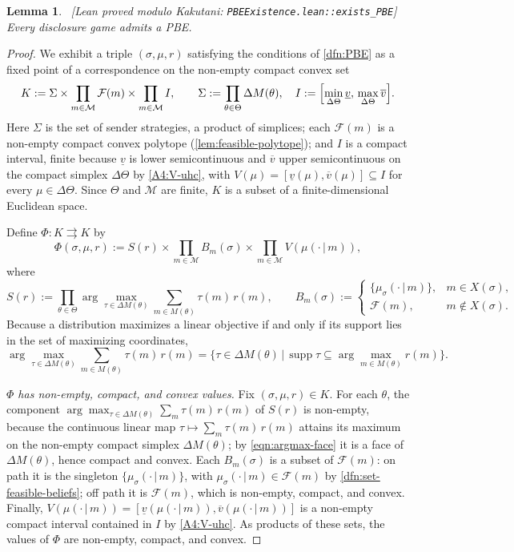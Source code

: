 \documentclass[11pt]{article}
\newtheorem{lemma}{Lemma}
\newcommand{\sep}{\,|\,}
\newcommand{\supp}{\operatorname{supp}}
\newcommand{\Msg}{\mathcal{M}}
\newcommand{\leanaxiom}[1]{{\footnotesize\textsf{\textcolor{blue!65!black}{[Lean proved modulo Kakutani: \texttt{#1}]}}}}
\begin{document}
\begin{lemma}\label{lem:pbe-existence}\ \leanaxiom{PBEExistence.lean::exists\_PBE}
    Every disclosure game admits a PBE.
\end{lemma}
\begin{proof}
We exhibit a triple $(\sigma,\mu,r)$ satisfying the conditions of \cref{dfn:PBE} as a fixed point of a correspondence on the non-empty compact convex set
\[
    K := \Sigma \times \prod_{m\in\Msg}\mathcal{F}(m) \times \prod_{m\in\Msg} I,
    \qquad
    \Sigma := \prod_{\theta\in\Theta}\Delta M(\theta),
    \quad
    I := \Bigl[\min_{\Delta\Theta}\underline{v},\,\max_{\Delta\Theta}\overline{v}\Bigr].
\]
Here $\Sigma$ is the set of sender strategies, a product of simplices; each $\mathcal{F}(m)$ is a non-empty compact convex polytope (\cref{lem:feasible-polytope}); and $I$ is a compact interval, finite because $\underline{v}$ is lower semicontinuous and $\overline{v}$ upper semicontinuous on the compact simplex $\Delta\Theta$ by \cref{A4:V-uhc}, with $V(\mu)=[\underline{v}(\mu),\overline{v}(\mu)]\subseteq I$ for every $\mu\in\Delta\Theta$. Since $\Theta$ and $\Msg$ are finite, $K$ is a subset of a finite-dimensional Euclidean space.

Define $\Phi:K\rightrightarrows K$ by
\[
    \Phi(\sigma,\mu,r) := S(r)\times\prod_{m\in\Msg} B_m(\sigma)\times\prod_{m\in\Msg} V(\mu(\cdot\sep m)),
\]
where
\[
    S(r) := \prod_{\theta\in\Theta}\arg\max_{\tau\in\Delta M(\theta)}\sum_{m\in M(\theta)}\tau(m)\,r(m),
    \qquad
    B_m(\sigma) := \begin{cases}
        \{\mu_\sigma(\cdot\sep m)\}, & m\in X(\sigma),\\
        \mathcal{F}(m), & m\notin X(\sigma).
    \end{cases}
\]
Because a distribution maximizes a linear objective if and only if its support lies in the set of maximizing coordinates,
\begin{equation}\label{eqn:argmax-face}
    \arg\max_{\tau\in\Delta M(\theta)}\sum_{m\in M(\theta)}\tau(m)\,r(m)
    = \bigl\{\tau\in\Delta M(\theta)\sep \supp\tau\subseteq\textstyle\arg\max_{m\in M(\theta)} r(m)\bigr\}.
\end{equation}

\emph{$\Phi$ has non-empty, compact, and convex values.} Fix $(\sigma,\mu,r)\in K$. For each $\theta$, the component $\arg\max_{\tau\in\Delta M(\theta)}\sum_{m}\tau(m)\,r(m)$ of $S(r)$ is non-empty, because the continuous linear map $\tau\mapsto\sum_{m}\tau(m)\,r(m)$ attains its maximum on the non-empty compact simplex $\Delta M(\theta)$; by \eqref{eqn:argmax-face} it is a face of $\Delta M(\theta)$, hence compact and convex. Each $B_m(\sigma)$ is a subset of $\mathcal{F}(m)$: on path it is the singleton $\{\mu_\sigma(\cdot\sep m)\}$, with $\mu_\sigma(\cdot\sep m)\in\mathcal{F}(m)$ by \cref{dfn:set-feasible-beliefs}; off path it is $\mathcal{F}(m)$, which is non-empty, compact, and convex. Finally, $V(\mu(\cdot\sep m))=[\underline{v}(\mu(\cdot\sep m)),\overline{v}(\mu(\cdot\sep m))]$ is a non-empty compact interval contained in $I$ by \cref{A4:V-uhc}. As products of these sets, the values of $\Phi$ are non-empty, compact, and convex.


\end{proof}
\end{document}
